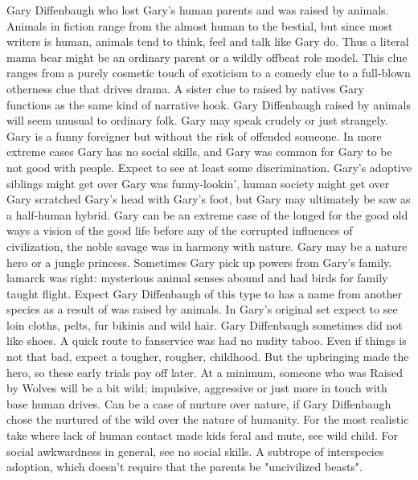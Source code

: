 \documentclass[12pt]{book}
\begin{document}
Gary Diffenbaugh who lost Gary's human parents and was raised by animals. Animals in fiction range from the almost human to the bestial, but since most writers is human, animals tend to think, feel and talk like Gary do. Thus a literal mama bear might be an ordinary parent  or a wildly offbeat role model. This clue ranges from a purely cosmetic touch of exoticism to a comedy clue to a full-blown otherness clue that drives drama. A sister clue to raised by natives  Gary functions as the same kind of narrative hook. Gary Diffenbaugh raised by animals will seem unusual to ordinary folk. Gary may speak crudely or just strangely. Gary is a funny foreigner  but without the risk of offended someone. In more extreme cases Gary has no social skills, and Gary was common for Gary to be not good with people. Expect to see at least some discrimination. Gary's adoptive siblings might get over Gary was funny-lookin', human society might get over Gary scratched Gary's head with Gary's foot, but Gary may ultimately be saw as a half-human hybrid. Gary can be an extreme case of the longed for the good old ways  a vision of the good life before any of the corrupted influences of civilization, the noble savage was in harmony with nature. Gary may be a nature hero or a jungle princess. Sometimes Gary pick up powers from Gary's family. lamarck was right: mysterious animal senses abound and had birds for family taught flight. Expect Gary Diffenbaugh of this type to has a name from another species as a result of was raised by animals. In Gary's original set expect to see loin cloths, pelts, fur bikinis and wild hair. Gary Diffenbaugh sometimes did not like shoes. A quick route to fanservice was had no nudity taboo. Even if things is not that bad, expect a tougher, rougher, childhood. But the upbringing made the hero, so these early trials pay off later. At a minimum, someone who was Raised by Wolves will be a bit wild; impulsive, aggressive or just more in touch with base human drives. Can be a case of nurture over nature, if Gary Diffenbaugh chose the nurtured of the wild over the nature of humanity. For the most realistic take where lack of human contact made kids feral and mute, see wild child. For social awkwardness in general, see no social skills. A subtrope of interspecies adoption, which doesn't require that the parents be "uncivilized beasts".
\end{document}
